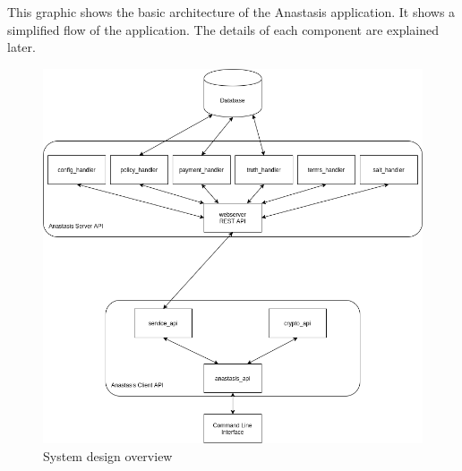 This graphic shows the basic architecture of the Anastasis
application. It shows a simplified flow of the application. The
details of each component are explained later.

\begin{figure}[H]
	\centering
		\includegraphics[scale=0.4]{images/system_design.png}
	\caption{System design overview}
	\label{fig:system_design}
\end{figure}

